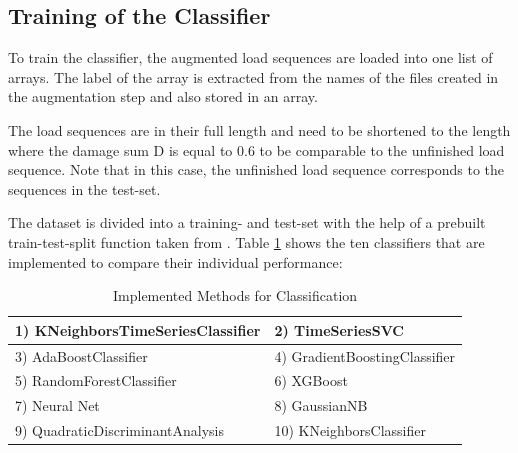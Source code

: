 \subsection{Training of the Classifier}
To train the classifier, the augmented load sequences are loaded into one list of arrays. The label of the array is extracted from the names of the files created in the augmentation step and also stored in an array. 

The load sequences are in their full length and need to be shortened to the length where the damage sum D is equal to 0.6 to be comparable to the unfinished load sequence. Note that in this case, the unfinished load sequence corresponds to the sequences in the test-set. 


The dataset is divided into a training- and test-set with the help of a prebuilt train-test-split function taken from \cite{SKlearn}. Table \ref{methods} shows the ten classifiers that are implemented to compare their individual performance:



\begin{table}
	\begin{center}
		\begin{tabular}{|| l | l ||}\hline
			\rule{0pt}{2ex}1) KNeighborsTimeSeriesClassifier \cite{tslearn} & 2) TimeSeriesSVC \cite{tslearn}\\	\hline
			3) AdaBoostClassifier \cite{SKlearn} & 4) GradientBoostingClassifier \cite{SKlearn} \\ \hline
		5) RandomForestClassifier \cite{SKlearn} & 6) XGBoost\cite{XG}\\ \hline
			7) Neural Net \cite{SKlearn} & 8) GaussianNB \cite{SKlearn} \\ \hline
			9) QuadraticDiscriminantAnalysis \cite{SKlearn} & 10) KNeighborsClassifier \cite{SKlearn} \\ \hline
		\end{tabular}
		\caption{Implemented Methods for Classification}
		\label{methods}
	\end{center}
	\vspace{-4mm}
\end{table}
\newpage

